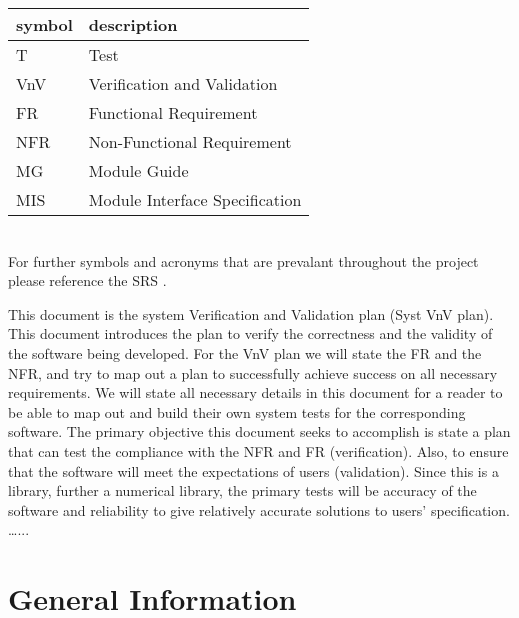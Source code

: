 \documentclass[12pt, titlepage]{article}
\begin{document}
\renewcommand{\arraystretch}{1.2}
\begin{tabular}{l l} 
  \toprule		
  \textbf{symbol} & \textbf{description}\\
  \midrule 
  T & Test\\
  VnV & Verification and Validation\\
  FR & Functional Requirement\\
  NFR & Non-Functional Requirement\\
  MG & Module Guide\\
  MIS & Module Interface Specification\\
  \bottomrule
\end{tabular}\\
For further symbols and acronyms that are prevalant
throughout the project please reference the SRS \citep{SRS}.




\newpage


This document is the system Verification and Validation plan (Syst VnV plan). This document introduces
the plan to verify the correctness and the validity of the software being developed.  For the VnV plan we
will state the FR and the NFR, and try to map out a plan to successfully achieve success on all necessary 
requirements. We will state all necessary details in this document for a reader to be able to map out and 
build their own system tests for the corresponding software. The primary objective this document seeks to
accomplish is state a plan that can test the compliance with the NFR and FR (verification). Also, to ensure 
that the software will meet the expectations of users (validation). Since this is a library, further a 
numerical library, the primary tests will be accuracy of the software and reliability to give relatively 
accurate solutions to users' specification. 
\dots... 

\section{General Information}
\end{document}
